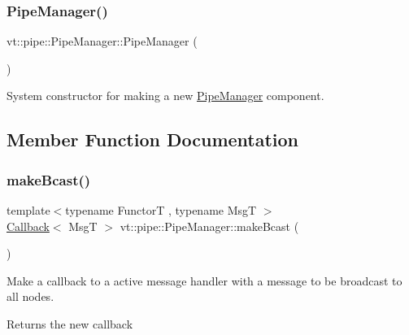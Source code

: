 \subsubsection{\texorpdfstring{Pipe\+Manager()}{PipeManager()}}
{\footnotesize\ttfamily vt\+::pipe\+::\+Pipe\+Manager\+::\+Pipe\+Manager (\begin{DoxyParamCaption}{ }\end{DoxyParamCaption})}



System constructor for making a new \hyperlink{structvt_1_1pipe_1_1_pipe_manager}{Pipe\+Manager} component. 



\subsection{Member Function Documentation}
\mbox{\label{structvt_1_1pipe_1_1_pipe_manager_a2ea6bd5ea3e001662681b1e5a1971e9d}} 
\subsubsection{\texorpdfstring{make\+Bcast()}{makeBcast()}\hspace{0.1cm}{\footnotesize\ttfamily [1/6]}}
{\footnotesize\ttfamily template$<$typename FunctorT , typename MsgT $>$ \\
\hyperlink{namespacevt_a36db99df4c973d48b1118a293fff533f}{Callback}$<$ MsgT $>$ vt\+::pipe\+::\+Pipe\+Manager\+::make\+Bcast (\begin{DoxyParamCaption}{ }\end{DoxyParamCaption})}



Make a callback to a active message handler with a message to be broadcast to all nodes. 

\begin{DoxyReturn}{Returns}
the new callback 
\end{DoxyReturn}
\mbox{\label{structvt_1_1pipe_1_1_pipe_manager_a50e15818da3bc48ac9f129fbd30c3e31}} 
